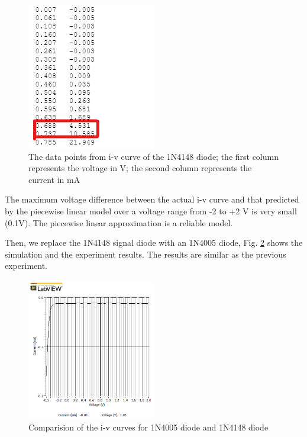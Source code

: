 \documentclass[letterpaper, 10 pt, conference]{ieeeconf}  %
\begin{document}
	\begin{figure}[h]
        \centering
        \includegraphics[width=0.5\textwidth]{images/result4.png}
        \caption{The data points from i-v curve of the 1N4148 diode; the first column represents the voltage in V; the second column represents the current in mA}
		\label{fig:5}
    \end{figure}
\par The maximum voltage difference between the actual i-v curve and that predicted by the piecewise linear model over a voltage range from -2 to +2 V is very small (0.1V). The piecewise linear approximation is a reliable model.
\par Then, we replace the 1N4148 signal diode with an 1N4005 diode, Fig. \ref{fig:6} shows the simulation and the experiment results. The results are similar as the previous experiment.
	\begin{figure}[h]
        \centering
        \includegraphics[width=0.5\textwidth]{images/result6.png}
        \caption{Comparision of the i-v curves for 1N4005 diode and 1N4148 diode}
		\label{fig:6}
    \end{figure}
\end{document}
